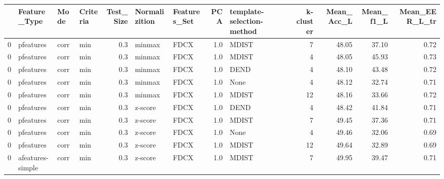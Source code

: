 \begin{tabular}{llllrllrlrrrr}
\toprule
{} &      Feature\_Type &  Mode & Criteria &  Test\_Size & Normalizition & Features\_Set &  PCA & template-selection-method &  k-cluster &  Mean\_Acc\_L &  Mean\_f1\_L &  Mean\_EER\_L\_tr \\
\midrule
0 &         pfeatures &  corr &      min &        0.3 &        minmax &         FDCX &  1.0 &                     MDIST &          7 &       48.05 &      37.10 &           0.72 \\
0 &         pfeatures &  corr &      min &        0.3 &        minmax &         FDCX &  1.0 &                     MDIST &          4 &       48.05 &      45.93 &           0.73 \\
0 &         pfeatures &  corr &      min &        0.3 &        minmax &         FDCX &  1.0 &                      DEND &          4 &       48.10 &      43.48 &           0.72 \\
0 &         pfeatures &  corr &      min &        0.3 &        minmax &         FDCX &  1.0 &                      None &          4 &       48.12 &      32.74 &           0.71 \\
0 &         pfeatures &  corr &      min &        0.3 &        minmax &         FDCX &  1.0 &                     MDIST &         12 &       48.16 &      33.66 &           0.72 \\
0 &         pfeatures &  corr &      min &        0.3 &       z-score &         FDCX &  1.0 &                      DEND &          4 &       48.42 &      41.84 &           0.71 \\
0 &         pfeatures &  corr &      min &        0.3 &       z-score &         FDCX &  1.0 &                     MDIST &          7 &       49.45 &      37.36 &           0.71 \\
0 &         pfeatures &  corr &      min &        0.3 &       z-score &         FDCX &  1.0 &                      None &          4 &       49.46 &      32.06 &           0.69 \\
0 &         pfeatures &  corr &      min &        0.3 &       z-score &         FDCX &  1.0 &                     MDIST &         12 &       49.64 &      32.89 &           0.69 \\
0 &  afeatures-simple &  corr &      min &        0.3 &       z-score &         FDCX &  1.0 &                     MDIST &          7 &       49.95 &      39.47 &           0.71 \\
\bottomrule
\end{tabular}

